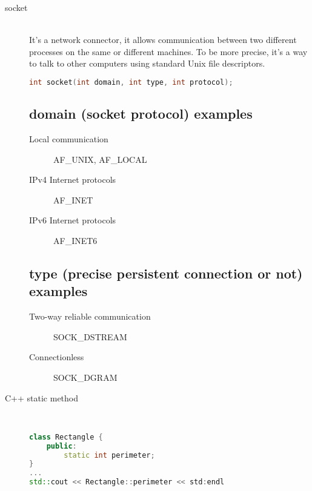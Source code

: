 \documentclass{article}
\begin{document}
\begin{description}
    \item[socket] \mbox{}\\
    It's a network connector, it allows communication between two different processes on the same or different machines. To be more precise, it's a way to talk to other computers using standard Unix file descriptors.

\begin{lstlisting}[language=C++]
int socket(int domain, int type, int protocol);
\end{lstlisting}

    \subsection{domain (socket protocol) examples}
    \begin{description}
        \item[Local communication] AF\_UNIX, AF\_LOCAL
        \item[IPv4 Internet protocols] AF\_INET
        \item[IPv6 Internet protocols] AF\_INET6
    \end{description}

    \subsection{type (precise persistent connection or not) examples}
    \begin{description}
        \item[Two-way reliable communication] SOCK\_DSTREAM
        \item[Connectionless] SOCK\_DGRAM
    \end{description}

    \item[C++ static method] \mbox{}\\
\begin{lstlisting}[language=C++]
class Rectangle {
    public:
        static int perimeter;
}
...
std::cout << Rectangle::perimeter << std:endl
\end{lstlisting} 


\end{description}
\end{document}
